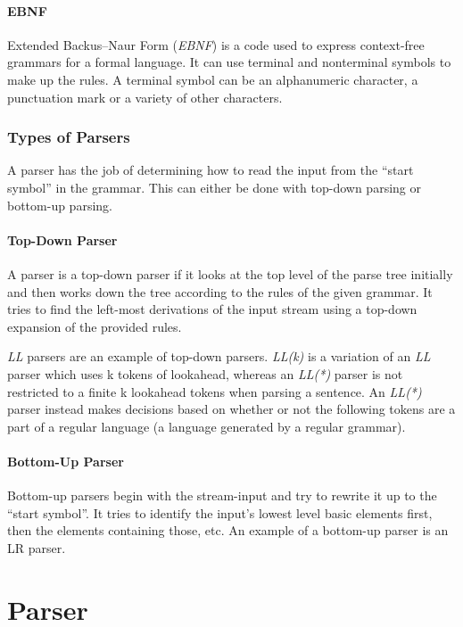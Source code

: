 \documentclass[draft]{report}
\begin{document}
\subsubsection{EBNF}

Extended Backus–Naur Form (\emph{EBNF}) is a code used to express context-free grammars for a formal language. It can use terminal and nonterminal symbols to make up the rules. A terminal symbol can be an alphanumeric character, a punctuation mark or a variety of other characters.

\subsection{Types of Parsers}

A parser has the job of determining how to read the input from the ``start symbol'' in the grammar. This can either be done with top-down parsing or bottom-up parsing. 

\subsubsection{Top-Down Parser}

A parser is a top-down parser if it looks at the top level of the parse tree initially and then works down the tree according to the rules of the given grammar. It tries to find the left-most derivations of the input stream using a top-down expansion of the provided rules.

\emph{LL} parsers are an example of top-down parsers. \emph{LL(k)} is a variation of an \emph{LL} parser which uses k tokens of lookahead, whereas an \emph{LL(*)} parser is not restricted to a finite k lookahead tokens when parsing a sentence. An \emph{LL(*)} parser instead makes decisions based on whether or not the following tokens are a part of a regular language (a language generated by a regular grammar).

\subsubsection{Bottom-Up Parser}

Bottom-up parsers begin with the stream-input and try to rewrite it up to the ``start symbol''. It tries to identify the input's lowest level basic elements first, then the elements containing those, etc. An example of a bottom-up parser is an LR parser.

\chapter{Parser}
\label{chap:parser}
\end{document}
